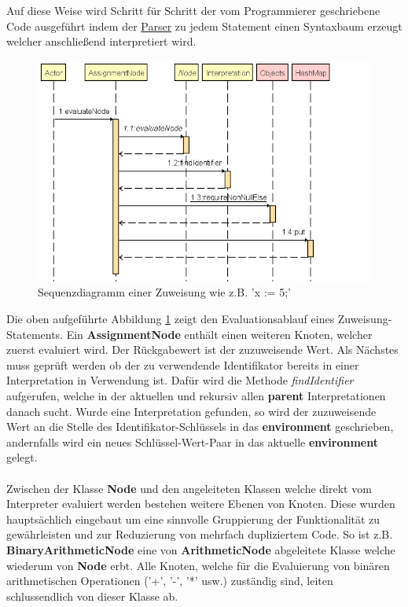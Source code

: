 Auf diese Weise wird Schritt für Schritt der vom Programmierer geschriebene Code ausgeführt indem der \underline{Parser} zu jedem Statement einen Syntaxbaum erzeugt welcher anschließend interpretiert wird.

\begin{figure}[H]
\centering
	\includegraphics[width=1.1\textwidth]{images/AssignmentSequenz.png}\par\vspace{0.5cm}
	\caption{Sequenzdiagramm einer Zuweisung wie z.B. 'x := 5;'}
	\label{fig:sequence-assignment}
\end{figure}

Die oben aufgeführte Abbildung \ref{fig:sequence-assignment} zeigt den Evaluationsablauf eines Zuweisung-Statements. Ein \textbf{AssignmentNode} enthält einen weiteren Knoten, welcher zuerst evaluiert wird. Der Rückgabewert ist der zuzuweisende Wert. Als Nächstes muss geprüft werden ob der zu verwendende Identifikator bereits in einer Interpretation in Verwendung ist. Dafür wird die Methode \textit{findIdentifier} aufgerufen, welche in der aktuellen und rekursiv allen \textbf{parent} Interpretationen danach sucht. Wurde eine Interpretation gefunden, so wird der zuzuweisende Wert an die Stelle des Identifikator-Schlüssels in das \textbf{environment} geschrieben, andernfalls wird ein neues Schlüssel-Wert-Paar in das aktuelle \textbf{environment} gelegt.
\\\\
Zwischen der Klasse \textbf{Node} und den angeleiteten Klassen welche direkt vom Interpreter evaluiert werden bestehen weitere Ebenen von Knoten. Diese wurden hauptsächlich eingebaut um eine sinnvolle Gruppierung der Funktionalität zu gewährleisten und zur Reduzierung von mehrfach dupliziertem Code. So ist z.B. \textbf{BinaryArithmeticNode} eine von \textbf{ArithmeticNode} abgeleitete Klasse welche wiederum von \textbf{Node} erbt. Alle Knoten, welche für die Evaluierung von binären arithmetischen Operationen ('+', '-', '*' usw.) zuständig sind, leiten schlussendlich von dieser Klasse ab.

